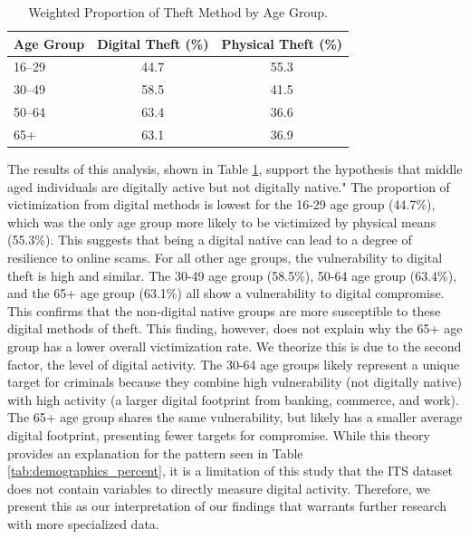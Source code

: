 \begin{table}[htbp]
  \centering %
  \caption{Weighted Proportion of Theft Method by Age Group.}
  \label{tab:age_theft_method} 
  \begin{tabular}{@{}lcc@{}} 
    \toprule
    \textbf{Age Group} & \textbf{Digital Theft (\%)} & \textbf{Physical Theft (\%)} \\
    \midrule
    16--29    & 44.7               & 55.3                \\
    30--49    & 58.5               & 41.5                \\
    50--64    & 63.4               & 36.6                \\
    65+       & 63.1               & 36.9                \\
    \bottomrule
  \end{tabular}
  \par 
  \vspace{0.5ex} 
  \small
 
\end{table}

The results of this analysis, shown in Table \ref{tab:age_theft_method}, support the hypothesis that middle aged individuals are digitally active but not digitally native." The proportion of victimization from digital methods is lowest for the 16-29 age group (44.7\%), which was the only age group more likely to be victimized by physical means (55.3\%). This suggests that being a digital native can lead to a degree of resilience to online scams. For all other age groups, the vulnerability to digital theft is high and similar. The 30-49 age group (58.5\%), 50-64 age group (63.4\%), and the 65+ age group (63.1\%) all show a vulnerability to digital compromise. This confirms that the non-digital native groups are more susceptible to these digital methods of theft. This finding, however, does not explain why the 65+ age group has a lower overall victimization rate. We theorize this is due to the second factor, the level of digital activity. The 30-64 age groups likely represent a unique target for criminals because they combine high vulnerability (not digitally native) with high activity (a larger digital footprint from banking, commerce, and work). The 65+ age group shares the same vulnerability, but likely has a smaller average digital footprint, presenting fewer targets for compromise. While this theory provides an explanation for the pattern seen in Table \ref{tab:demographics_percent}, it is a limitation of this study that the ITS dataset does not contain variables to directly measure digital activity. Therefore, we present this as our interpretation of our findings that warrants further research with more specialized data.


